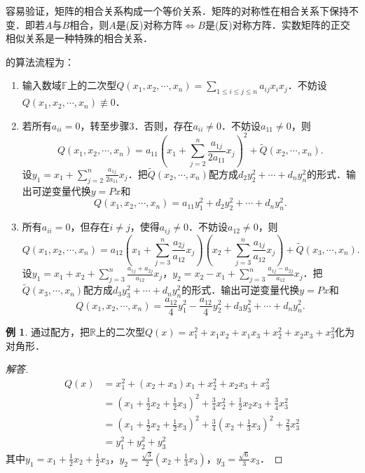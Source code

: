 \documentclass[a4paper,fontset=windows]{ctexbook}
\theoremstyle{definition}
\newtheorem{example}{例}[chapter]
\renewcommand{\le}{\leqslant}
\begin{document}
容易验证，矩阵的相合关系构成一个等价关系．矩阵的对称性在相合关系下保持不变．即若$A$与$B$相合，则$A$是(反)对称方阵$\Leftrightarrow B$是(反)对称方阵．实数矩阵的正交相似关系是一种特殊的相合关系．

的算法流程为：

\begin{enumerate}
\item 输入数域$\mathbb{F}$上的二次型$Q(x_1,x_2,\cdots,x_n)=\sum\limits_{1\le i\le j\le n}a_{ij}x_ix_j$．不妨设$Q(x_1,x_2,\cdots,x_n)\not\equiv 0$．

\item 若所有$a_{ii}=0$，转至步骤3．否则，存在$a_{ii}\ne 0$．不妨设$a_{11}\ne 0$，则
$$Q(x_1,x_2,\cdots,x_n)=a_{11}\left(x_1+\sum\limits_{j=2}^n\frac{a_{1j}}{2a_{11}}x_j\right)^2+\widetilde{Q}(x_2,\cdots,x_n).$$
设$y_1=x_1+\sum\limits_{j=2}^n\frac{a_{1j}}{2a_{11}}x_j$．把$\widetilde{Q}(x_2,\cdots,x_n)$配方成$d_2y_2^2+\cdots+d_ny_n^2$的形式．输出可逆变量代换$y=Px$和
$$Q(x_1,x_2,\cdots,x_n)=a_{11}y_1^2+d_2y_2^2+\cdots+d_ny_n^2.$$

\item 所有$a_{ii}=0$，但存在$i\ne j$，使得$a_{ij}\ne 0$．不妨设$a_{12}\ne 0$，则
$$Q(x_1,x_2,\cdots,x_n)=a_{12}\left(x_1+\sum\limits_{j=3}^n\frac{a_{2j}}{a_{12}}x_j\right)\left(x_2+\sum\limits_{j=3}^n\frac{a_{1j}}{a_{12}}x_j\right)+\widetilde{Q}(x_3,\cdots,x_n).$$
设$y_1=x_1+x_2+\sum\limits_{j=3}^n\frac{a_{1j}+a_{2j}}{a_{12}}x_j$，$y_2=x_2-x_1+\sum\limits_{j=3}^n\frac{a_{1j}-a_{2j}}{a_{12}}x_j$．把$\widetilde{Q}(x_3,\cdots,x_n)$配方成$d_3y_3^2+\cdots+d_ny_n^2$的形式．输出可逆变量代换$y=Px$和
$$Q(x_1,x_2,\cdots,x_n)=\frac{a_{12}}{4}y_1^2-\frac{a_{12}}{4}y_2^2+d_3y_3^2+\cdots+d_ny_n^2.$$
\end{enumerate}

\begin{example}
通过配方，把$\mathbb{R}$上的二次型$Q(x)=x_1^2+x_1x_2+x_1x_3+x_2^2+x_2x_3+x_3^2$化为对角形．
\end{example}

\begin{proof}[解答]
~\vspace*{-27pt}\begin{align*}
Q(x)&=x_1^2+(x_2+x_3)x_1+x_2^2+x_2x_3+x_3^2 \\
&=(x_1+\tfrac{1}{2}x_2+\tfrac{1}{2}x_3)^2+\tfrac{3}{4}x_2^2+\tfrac{1}{2}x_2x_3+\tfrac{3}{4}x_3^2 \\
&=(x_1+\tfrac{1}{2}x_2+\tfrac{1}{2}x_3)^2+\tfrac{3}{4}(x_2+\tfrac{1}{3}x_3)^2+\tfrac{2}{3}x_3^2 \\
&=y_1^2+y_2^2+y_3^2
\end{align*}
其中$y_1=x_1+\frac{1}{2}x_2+\frac{1}{2}x_3$，$y_2=\frac{\sqrt{3}}{2}(x_2+\frac{1}{3}x_3)$，$y_3=\frac{\sqrt{6}}{3}x_3$．
\end{proof}
\end{document}
